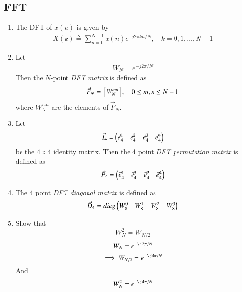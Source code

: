 \documentclass[journal,12pt,twocolumn]{IEEEtran}
\renewcommand\thesection{\arabic{section}}
\begin{document}
\begin{enumerate}[label=\thesection.\arabic*]
\section{FFT}
\begin{enumerate}[label=\arabic*.,ref=\thesection.\theenumi]
	\item The DFT of $x(n)$ is given by
	\begin{align}
		X(k) \triangleq \sum_{n=0}^{N-1} x(n) e^{-j 2 \pi k n / N}, \quad k=0,1, \ldots, N-1
	\end{align}
	\item Let 
	\begin{align}
		W_{N} = e^{-j2\pi/N} 
	\end{align}
	Then the $N$-point {\em DFT matrix} is defined as 
	\begin{align}
		\vec{F}_{N} = {}\left[W_{N}^{mn}\right], \quad 0 \le m,n \le N-1 
	\end{align}
	where $W_{N}^{mn}$ are the elements of $\vec{F}_{N}$.
	\item Let 
	\begin{align}
		\vec{I}_4 = \begin{pmatrix}\vec{e}_4^{1} &\vec{e}_4^{2} &\vec{e}_4^{3} &\vec{e}_4^{4} \end{pmatrix}
	\end{align}
	be the $4\times 4$ identity matrix.  Then the 4 point {\em DFT permutation matrix} is defined as 
	\begin{align}
		\vec{P}_4 = \begin{pmatrix}\vec{e}_4^{1} &\vec{e}_4^{3} &\vec{e}_4^{2} &\vec{e}_4^{4} \end{pmatrix}
	\end{align}
	\item The 4 point {\em DFT diagonal matrix} is defined as 
	\begin{align}
		\vec{D}_4 = diag\begin{pmatrix}W_{8}^{0} & W_{8}^{1} & W_{8}^{2} & W_{8}^{3}\end{pmatrix}
	\end{align}
	\item Show that 
	\begin{equation}
		W_{N}^{2}=W_{N/2}
	\end{equation}
	\solution
	\begin{equation}
		W_{N} = e^{-\j2\pi/N}
	\end{equation}
	\begin{equation}
		\implies W_{N/2} = e^{-\j4\pi/N}
	\end{equation}
	And
	\begin{equation}
		W_{N}^{2} = e^{-\j4\pi/N}

\end{equation}
\end{enumerate}
\end{enumerate}
\end{document}
